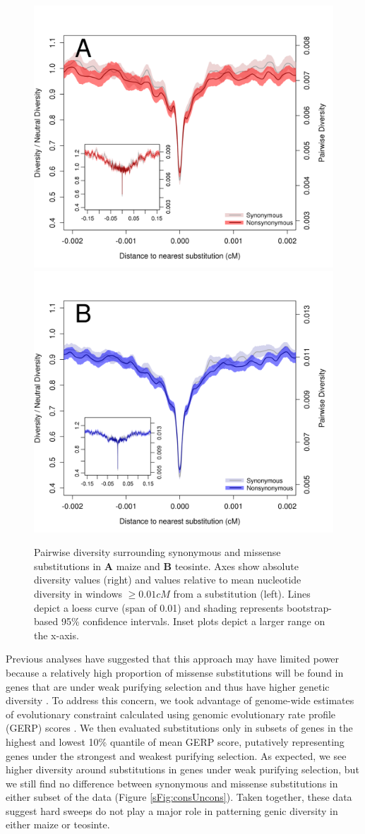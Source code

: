 \documentclass{pnastwo}
\begin{document}
\begin{article}
\begin{figure}[tb]
\centering
\includegraphics[width=.45\textwidth]{FigsAndFiles/plotDiversity_TvM_Folded2_Significance_Aug}
\hspace{0.05\textwidth} \includegraphics[width=.45\textwidth]{FigsAndFiles/plotDiversity_TvT_Folded2_Significance_Aug}
\caption{Pairwise diversity surrounding synonymous and missense  substitutions in {\bf A} maize and {\bf B} teosinte. Axes show absolute diversity values (right) and values relative to mean nucleotide diversity in windows $\geq 0.01 cM$ from a substitution (left).  Lines depict a loess curve (span of 0.01) and shading represents bootstrap-based 95\% confidence intervals. Inset plots depict a larger range on the x-axis. \label{fig:hardSweeps}}
\end{figure}

Previous analyses have suggested that this approach may have limited power because a relatively high proportion of missense substitutions will be found in genes that are under weak purifying selection and thus have higher genetic diversity \cite{enard2014}. 
To address this concern, we took advantage of genome-wide estimates of evolutionary constraint \cite{rodgers2015} calculated using genomic evolutionary rate profile (GERP) scores \cite{davydov2010}. 
We then evaluated substitutions only in subsets of genes in the highest and lowest 10\% quantile of mean GERP score, putatively representing genes under the strongest and weakest purifying selection. 
As expected, we see higher diversity around substitutions in genes under weak purifying selection, but we still find no difference between synonymous and missense substitutions in either subset of the data (Figure \ref{sFig:consUncons}).
Taken together, these data suggest hard sweeps do not play a major role in patterning genic diversity in either maize or teosinte.





\end{article}
\end{document}
